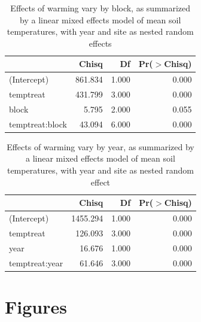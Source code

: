 \documentclass{article}
\begin{document}
\begin{table}[ht]
\centering
\begin{tabular}{lrrr}
  \hline
 & Chisq & Df & Pr($>$Chisq) \\ 
  \hline
(Intercept) & 861.834 & 1.000 & 0.000 \\ 
  temptreat & 431.799 & 3.000 & 0.000 \\ 
  block & 5.795 & 2.000 & 0.055 \\ 
  temptreat:block & 43.094 & 6.000 & 0.000 \\ 
   \hline
\end{tabular}
\caption{Effects of warming vary by block, as summarized by a linear mixed effects model of mean soil temperatures, with year and site as nested random effects} 
\end{table}%
\begin{table}[ht]
\centering
\begin{tabular}{lrrr}
  \hline
 & Chisq & Df & Pr($>$Chisq) \\ 
  \hline
(Intercept) & 1455.294 & 1.000 & 0.000 \\ 
  temptreat & 126.093 & 3.000 & 0.000 \\ 
  year & 16.676 & 1.000 & 0.000 \\ 
  temptreat:year & 61.646 & 3.000 & 0.000 \\ 
   \hline
\end{tabular}
\caption{Effects of warming vary by year, as summarized by a linear mixed effects model of mean soil temperatures, with year and site as nested random effect} 
\end{table}\section* {Figures}
\end{document}
